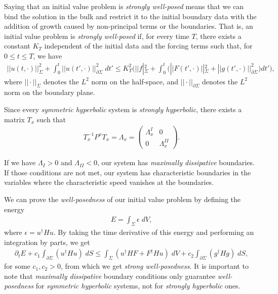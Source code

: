 Saying that an initial value problem is \textit{strongly well-posed} means that we can bind the solution in the bulk and restrict it to the initial boundary data with the addition of growth caused by non-principal terms or the boundaries. That is, an initial value problem is \textit{strongly well-posed} if, for every time $T$, there exists a constant $K_T$ independent of the initial data and the forcing terms such that, for $0 \leq t \leq T$, we have
%
\begin{align}
 ||u(t,\cdot)||^{2}_\Sigma + \int_{0}^{t} ||u(t',\cdot)||^{2}_{\partial \Sigma} \; dt' 
     \leq K_{T}^{2} \Bigg( ||f|^{2}_\Sigma + \int_{0}^{t} \Big(||F(t',\cdot)||^{2}_\Sigma + ||g(t',\cdot)||^{2}_{\partial \Sigma} \Big) dt' \Bigg),
\end{align}
%
where $||\cdot||_\Sigma$ denotes the $L^2$ norm on the half-space, and $||\cdot||_{\partial \Sigma}$ denotes the $L^2$ norm on the boundary plane.

Since every \textit{symmetric hyperbolic} system is \textit{strongly hyperbolic}, there exists a matrix $T_x$ such that
%
\begin{align}
 T_x^{-1}P^x T_x = \Lambda_x = 
    \begin{pmatrix} 
        \Lambda_x^I & 0 \\
        0 & \Lambda_x^{II} 
    \end{pmatrix}.
\end{align}

If we have $\Lambda_I > 0$ and $\Lambda_{II} < 0$, our system has \textit{maximally dissipative} boundaries. If those conditions are not met, our system has characteristic boundaries in the variables where the characteristic speed vanishes at the boundaries.

We can prove the \textit{well-posedness} of our initial value problem by defining the energy
%
\begin{align}
 E = \int_\Sigma \epsilon \; dV,
\end{align}
%
where $\epsilon = u^\dagger H u$. By taking the time derivative of this energy and performing an integration by parts, we get
%
\begin{align}
  \partial_t E + c_1 \int_{\partial\Sigma} \left( u^\dagger H u \right) \; dS 
    \leq \int_\Sigma \left( u^\dagger H F + F^\dagger H u \right) \; dV + c_2 \int_{\partial \Sigma} \left( g^\dagger H g\right) \; dS ,
\end{align}
%
for some $c_1, c_2 > 0$, from which we get \textit{strong well-posedness}. It is important to note that \textit{maximally dissipative} boundary conditions only guarantee \textit{well-posedness} for \textit{symmetric hyperbolic} systems, not for \textit{strongly hyperbolic} ones.

